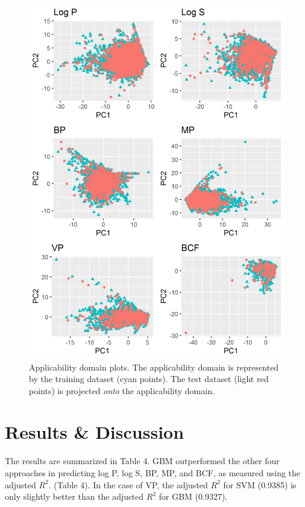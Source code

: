 \documentclass[10pt, letter]{article}
\renewcommand{\=}{\, =\, }
\newcommand{\+}{\, +\, }
\renewcommand{\-}{\, -\, }
\begin{document}
\begin{figure}[H]
  \caption{Applicability domain plots. The applicability domain is represented by the training dataset (cyan points). The test dataset (light red points) is projected \textit{onto} the applicability domain.}
  \centering
    \includegraphics[scale=1.0]{PC_plots.png}
\end{figure}


\section{Results \& Discussion}

The results are summarized in Table 4. GBM outperformed the other four approaches in predicting log P, log S,
 BP, MP, and BCF, as measured using the adjusted \( R^2\). (Table 4). In the case of VP, the adjusted \( R^2\) for SVM (0.9385) is only slightly better than the adjusted \( R^2\) for GBM (0.9327).
\end{document}
